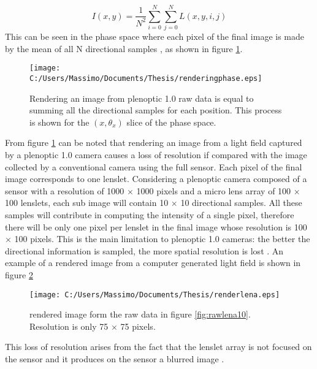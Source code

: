\begin{equation}
\label{eq:rendering3}
I(x,y) = \dfrac{1}{N^2}\sum_{i=0}^N\sum_{j=0}^N L(x,y,i,j)
\end{equation}
This can be seen in the phase space where each pixel of the final image is made by the mean of all N directional samples \cite{georgiev2010focused}, as shown in figure \ref{fig:rendering2}.
 \begin{figure}[H]
 	\centering
 	\texttt{[image: C:/Users/Massimo/Documents/Thesis/renderingphase.eps]}
 	\caption{\label{fig:rendering2} Rendering an image from plenoptic 1.0 raw data is equal to summing all the directional samples for each position. This process is shown for the $(x,\theta_x)$ slice of the phase space. \cite{georgiev2010focused} }
 \end{figure}
 From figure \ref{fig:rendering2} can be noted that rendering an image from a light field captured by a plenoptic 1.0 camera causes a loss of resolution if compared with the image collected by a conventional camera using the full sensor. Each pixel of the final image corresponds to one lenslet. Considering a plenoptic camera composed of a sensor with a resolution of 1000 $\times$ 1000 pixels and a micro lens array of 100 $\times$ 100 lenslets, each sub image will contain 10 $\times$ 10 directional samples. All these samples will contribute in computing the intensity of a single pixel, therefore there will be only one pixel per lenslet in the final image whose resolution is 100 $\times$ 100 pixels. This is the main limitation to plenoptic 1.0 cameras: the better the directional information is sampled, the more spatial resolution is lost \cite{georgiev2010focused, ng2006digital}. An example of a rendered image from a computer generated light field is shown in figure \ref{fig:renderlena}
 \begin{figure}[H]
 	\centering
 	\texttt{[image: C:/Users/Massimo/Documents/Thesis/renderlena.eps]}
 	\caption{\label{fig:renderlena} rendered image form the raw data in figure \ref{fig:rawlena10}. Resolution is only 75 $\times$ 75 pixels.  }
 \end{figure}
 This loss of resolution arises from the fact that the lenslet array is not focused on the sensor and it produces on the sensor a blurred image \cite{georgiev2010focused}.
